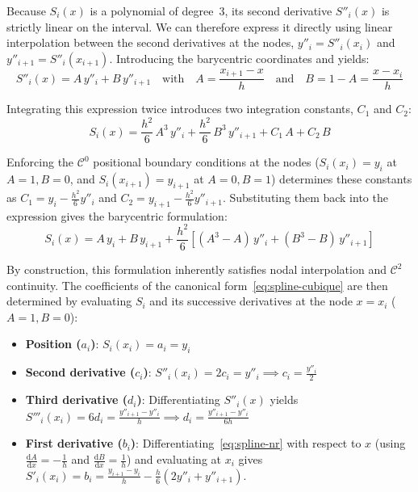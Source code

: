 \documentclass{tropLaClasse}
\begin{document}
Because $S_i(x)$ is a polynomial of degree~3, its second derivative $S''_i(x)$ is strictly linear on the interval. We can therefore express it directly using linear interpolation between the second derivatives at the nodes, $y''_i = S''_i(x_i)$ and $y''_{i+1} = S''_i(x_{i+1})$. Introducing the barycentric coordinates  and  yields:
\begin{equation}
    S''_i(x) = A\,y''_i + B\,y''_{i+1} \quad \text{with} \quad A = \frac{x_{i+1} - x}{h} \quad \text{and} \quad B = 1 - A = \frac{x - x_i}{h}
\end{equation}

Integrating this expression twice introduces two integration constants, $C_1$ and $C_2$:
\begin{equation}
    S_i(x) = \frac{h^2}{6}\,A^3\,y''_i + \frac{h^2}{6}\,B^3\,y''_{i+1} + C_1\,A + C_2\,B
\end{equation}

Enforcing the $\mathcal{C}^0$ positional boundary conditions at the nodes ($S_i(x_i) = y_i$ at $A=1, B=0$, and $S_i(x_{i+1}) = y_{i+1}$ at $A=0, B=1$) determines these constants as $C_1 = y_i - \frac{h^2}{6}y''_i$ and $C_2 = y_{i+1} - \frac{h^2}{6}y''_{i+1}$. Substituting them back into the expression gives the barycentric formulation:
\begin{equation}
    S_i(x) = A\,y_i + B\,y_{i+1}
    + \frac{h^2}{6}\left[(A^3 - A)\,y''_i + (B^3 - B)\,y''_{i+1}\right]
    \label{eq:spline-nr}
\end{equation}

By construction, this formulation inherently satisfies nodal interpolation and $\mathcal{C}^2$ continuity. The coefficients of the canonical form~\eqref{eq:spline-cubique} are then determined by evaluating $S_i$ and its successive derivatives at the node $x = x_i$ ($A=1, B=0$):
\begin{itemize}
    \item \textbf{Position ($a_i$)}: $S_i(x_i) = a_i = y_i$
    \item \textbf{Second derivative ($c_i$)}: $S''_i(x_i) = 2c_i = y''_i \implies c_i = \frac{y''_i}{2}$
    \item \textbf{Third derivative ($d_i$)}: Differentiating $S''_i(x)$ yields $S'''_i(x_i) = 6d_i = \frac{y''_{i+1} - y''_i}{h} \implies d_i = \frac{y''_{i+1} - y''_i}{6h}$
    \item \textbf{First derivative ($b_i$)}: Differentiating~\eqref{eq:spline-nr} with respect to $x$ (using $\frac{\mathrm{d}A}{\mathrm{d}x} = -\frac{1}{h}$ and $\frac{\mathrm{d}B}{\mathrm{d}x} = \frac{1}{h}$) and evaluating at $x_i$ gives $S'_i(x_i) = b_i = \frac{y_{i+1} - y_i}{h} - \frac{h}{6}(2y''_i + y''_{i+1})$.
\end{itemize}
\end{document}
